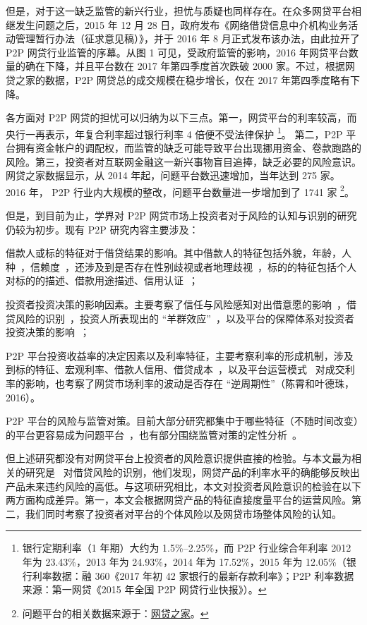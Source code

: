 \documentclass[lang=cn,11pt]{elegantpaper}
\begin{document}
但是，对于这一缺乏监管的新兴行业，担忧与质疑也同样存在。在众多网贷平台相继发生问题之后，2015 年 12 月 28 日，政府发布《网络借贷信息中介机构业务活动管理暂行办法（征求意见稿）》，并于 2016 年 8 月正式发布该办法，由此拉开了 P2P 网贷行业监管的序幕。从图 1 可见，受政府监管的影响，2016 年网贷平台数量的确在下降，并且平台数在 2017 年第四季度首次跌破 2000 家。不过，根据网贷之家的数据，P2P 网贷总的成交规模在稳步增长，仅在 2017 年第四季度略有下降。

各方面对 P2P 网贷的担忧可以归纳为以下三点。第一，网贷平台的利率较高，而央行一再表示，年复合利率超过银行利率 4 倍便不受法律保护 \footnote{银行定期利率（1 年期）大约为 1.5\%--2.25\%，而 P2P 行业综合年利率 2012 年为 23.43\%，2013 年为 24.93\%，2014 年为 17.52\%，2015 年为 12.05\%（银行利率数据：融 360《2017 年初 42 家银行的最新存款利率》；P2P 利率数据来源：第一网贷《2015 年全国 P2P 网贷行业快报》）。}。 第二，P2P 平台拥有资金帐户的调配权，而监管的缺乏可能导致平台出现挪用资金、卷款跑路的风险。第三，投资者对互联网金融这一新兴事物盲目追捧，缺乏必要的风险意识。网贷之家数据显示，从 2014 年起，问题平台数迅速增加，当年达到 275 家。 2016 年， P2P 行业内大规模的整改，问题平台数量进一步增加到了 1741 家 \footnote{问题平台的相关数据来源于：\href{http://www.wdzj.com/}{网贷之家}。}。

但是，到目前为止，学界对 P2P 网贷市场上投资者对于风险的认知与识别的研究仍较为初步。现有 P2P 研究内容主要涉及：
\begin{enumerate*}[label=（\arabic*）]
	\item 借款人或标的特征对于借贷结果的影响。其中借款人的特征包括外貌，年龄，人种~\citep{Ravina2008}，信赖度~\citep{Duarte2012}，还涉及到是否存在性别歧视或者地理歧视~\citep{lllmrwzw2014b,Komarova2015}，标的的特征包括个人对标的的描述、借款用途描述、信用认证~\citep{lygyjlznczhwytyyx2014,phfzhyzy2016,ydzcx2017}；
	\item 投资者投资决策的影响因素。主要考察了信任与风险感知对出借意愿的影响~\cite{cdyzhzhc2014}，借贷风险的识别~\citep{lllmrwzw2014a}，投资人所表现出的 “羊群效应”~\citep{lllmrwzwhpf2015}，以及平台的保障体系对投资者投资决策的影响~\citep{lsxlh2015}；
	\item P2P 平台投资收益率的决定因素以及利率特征，主要考察利率的形成机制，涉及到标的特征、宏观利率、借款人信用、借贷成本~\citep{Dietrich2016,cxydz2016}，以及平台运营模式~\citep{chmyj2016} 对成交利率的影响，也考察了网贷市场利率的波动是否存在 “逆周期性”（陈霄和叶德珠，2016）。
	\item P2P 平台的风险与监管对策。目前大部分研究都集中于哪些特征（不随时间改变）的平台更容易成为问题平台~\citep{hypsywjy2016,wlfcxmm2014,wxhmloyh2016}，也有部分围绕监管对策的定性分析~\citep{ajd2012,wj2015,Slattery2013}。
\end{enumerate*}
但上述研究都没有对网贷平台上投资者的风险意识提供直接的检验。与本文最为相关的研究是~\cite{lllmrwzw2014a} 对借贷风险的识别，他们发现，网贷产品的利率水平的确能够反映出产品未来违约风险的高低。与这项研究相比，本文对投资者风险意识的检验在以下两方面构成差异。第一，本文会根据网贷产品的特征直接度量平台的运营风险。第二，我们同时考察了投资者对平台的个体风险以及网贷市场整体风险的认知。
\end{document}
